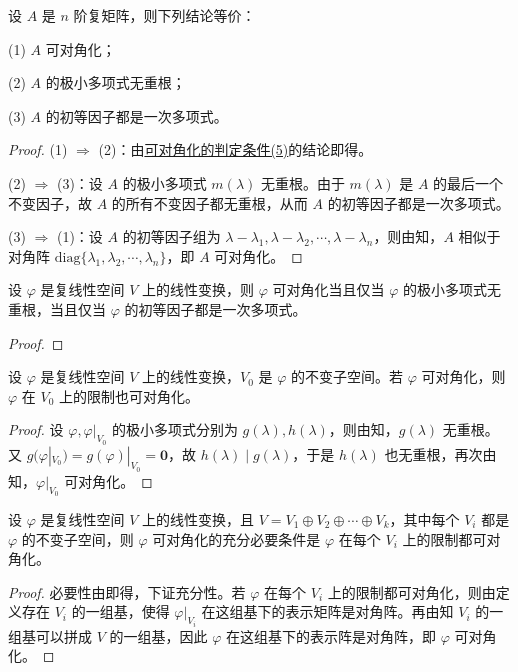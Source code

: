 \documentclass[../../main.tex]{subfiles}
\begin{document}
\begin{corollary}
设 $A$ 是 $n$ 阶复矩阵，则下列结论等价：

(1) $A$ 可对角化；

(2) $A$ 的极小多项式无重根；

(3) $A$ 的初等因子都是一次多项式。
\end{corollary}
\begin{proof}
(1) $\Rightarrow$ (2)：由\hyperref[theorem:可对角化的判定条件]{可对角化的判定条件(5)}的结论即得。

(2) $\Rightarrow$ (3)：设 $A$ 的极小多项式 $m(\lambda)$ 无重根。由于 $m(\lambda)$ 是 $A$ 的最后一个不变因子，故 $A$ 的所有不变因子都无重根，从而 $A$ 的初等因子都是一次多项式。

(3) $\Rightarrow$ (1)：设 $A$ 的初等因子组为 $\lambda - \lambda_1,\lambda - \lambda_2,\cdots,\lambda - \lambda_n$，则由知，$A$ 相似于对角阵 $\mathrm{diag}\{\lambda_1,\lambda_2,\cdots,\lambda_n\}$，即 $A$ 可对角化。
\end{proof}

\begin{corollary}\label{corollary:矩阵可对角化的几何叙述}
设 $\varphi$ 是复线性空间 $V$ 上的线性变换，则 $\varphi$ 可对角化当且仅当 $\varphi$ 的极小多项式无重根，当且仅当 $\varphi$ 的初等因子都是一次多项式。
\end{corollary}
\begin{proof}

\end{proof}

\begin{corollary}\label{corollary:线性变换可对角化则其在不变子空间的限制上也可对角化}
设 $\varphi$ 是复线性空间 $V$ 上的线性变换，$V_0$ 是 $\varphi$ 的不变子空间。若 $\varphi$ 可对角化，则 $\varphi$ 在 $V_0$ 上的限制也可对角化。
\end{corollary}
\begin{proof}
设 $\varphi,\varphi|_{V_0}$ 的极小多项式分别为 $g(\lambda),h(\lambda)$，则由知，$g(\lambda)$ 无重根。又 $g(\varphi|_{V_0}) = g(\varphi)|_{V_0} = \mathbf{0}$，故 $h(\lambda)\mid g(\lambda)$，于是 $h(\lambda)$ 也无重根，再次由知，$\varphi|_{V_0}$ 可对角化。
\end{proof}

\begin{corollary}\label{corollary:线性变换可对角化关于在直和分解限制的充要条件}
设 $\varphi$ 是复线性空间 $V$ 上的线性变换，且 $V = V_1\oplus V_2\oplus\cdots\oplus V_k$，其中每个 $V_i$ 都是 $\varphi$ 的不变子空间，则 $\varphi$ 可对角化的充分必要条件是 $\varphi$ 在每个 $V_i$ 上的限制都可对角化。
\end{corollary}
\begin{proof}
必要性由即得，下证充分性。若 $\varphi$ 在每个 $V_i$ 上的限制都可对角化，则由定义存在 $V_i$ 的一组基，使得 $\varphi|_{V_i}$ 在这组基下的表示矩阵是对角阵。再由知 $V_i$ 的一组基可以拼成 $V$ 的一组基，因此 $\varphi$ 在这组基下的表示阵是对角阵，即 $\varphi$ 可对角化。
\end{proof}
\end{document}

